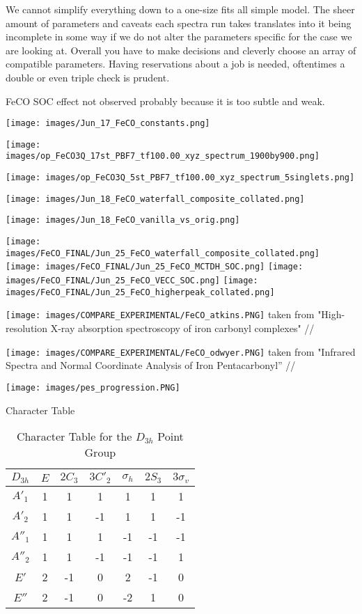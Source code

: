 We cannot simplify everything down to a one-size fits all simple model. The sheer amount of parameters and caveats each spectra run takes translates into it being incomplete in some way if we do not alter the parameters specific for the case we are looking at. Overall you have to make decisions and cleverly choose an array of compatible parameters. Having reservations about a job is needed, oftentimes a double or even triple check is prudent.


FeCO SOC effect not observed probably because it is too subtle and weak. 

\texttt{[image: images/Jun\_17\_FeCO\_constants.png]}

\texttt{[image: images/op\_FeCO3Q\_17st\_PBF7\_tf100.00\_xyz\_spectrum\_1900by900.png]}

\texttt{[image: images/op\_FeCO3Q\_5st\_PBF7\_tf100.00\_xyz\_spectrum\_5singlets.png]}

\texttt{[image: images/Jun\_18\_FeCO\_waterfall\_composite\_collated.png]}

\texttt{[image: images/Jun\_18\_FeCO\_vanilla\_vs\_orig.png]}

\texttt{[image: images/FeCO\_FINAL/Jun\_25\_FeCO\_waterfall\_composite\_collated.png]}
\texttt{[image: images/FeCO\_FINAL/Jun\_25\_FeCO\_MCTDH\_SOC.png]}
\texttt{[image: images/FeCO\_FINAL/Jun\_25\_FeCO\_VECC\_SOC.png]}
\texttt{[image: images/FeCO\_FINAL/Jun\_25\_FeCO\_higherpeak\_collated.png]}




\texttt{[image: images/COMPARE\_EXPERIMENTAL/FeCO\_atkins.PNG]}
taken from "High-resolution X-ray absorption spectroscopy of iron carbonyl complexes" //

\texttt{[image: images/COMPARE\_EXPERIMENTAL/FeCO\_odwyer.PNG]}
taken from "Infrared Spectra and Normal Coordinate Analysis of Iron Pentacarbonyl” // 



\texttt{[image: images/pes\_progression.PNG]}


 Character Table
\begin{table}[h]\centering
    \caption{Character Table for the $D_{3h}$ Point Group}
    \begin{tabular}{c|cccccc}
        \hline
        $D_{3h}$ & $E$ & $2C_3$ & $3C'_2$ & $\sigma_h$ & $2S_3$ & $3\sigma_v$ \\
        \hline
        $A'_1$   & 1 &  1 &  1 &  1 &  1 &  1 \\
        $A'_2$   & 1 &  1 & -1 &  1 &  1 & -1 \\
        $A''_1$  & 1 &  1 &  1 & -1 & -1 & -1 \\
        $A''_2$  & 1 &  1 & -1 & -1 & -1 &  1 \\
        $E'$     & 2 & -1 &  0 &  2 & -1 &  0 \\
        $E''$    & 2 & -1 &  0 & -2 &  1 &  0 \\
        \hline
    \end{tabular}
    \label{tab:character_table_d3h}
\end{table}

